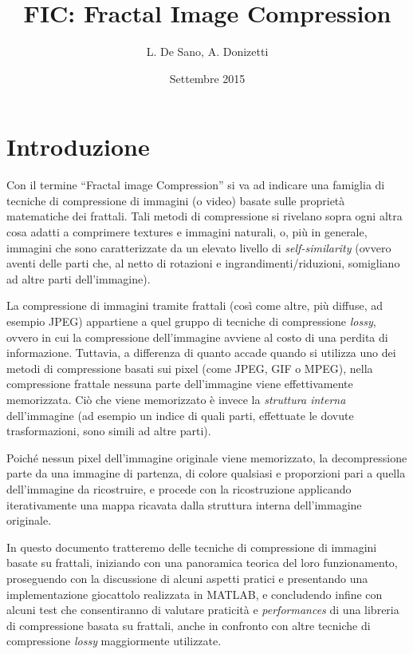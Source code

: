 \documentclass[11pt,a4paper,appendixprefix=true,numbers=noenddot]{scrreprt}
\author{L. De Sano, A. Donizetti}
\title{\textsc{FIC}: Fractal Image Compression}
\date{Settembre 2015}
\begin{document}
\maketitle

\tableofcontents

\chapter{Introduzione}

Con il termine ``Fractal image Compression'' si va ad indicare una famiglia di tecniche di compressione di immagini (o video) basate sulle proprietà matematiche dei frattali\cite{fisher}\cite{barnsley}. Tali metodi di compressione si rivelano sopra ogni altra cosa adatti a comprimere textures e immagini naturali, o, più in generale, immagini che sono caratterizzate da un elevato livello di \emph{self-similarity} (ovvero aventi delle parti che, al netto di rotazioni e ingrandimenti/riduzioni, somigliano ad altre parti dell'immagine).

La compressione di immagini tramite frattali (così come altre, più diffuse, ad esempio JPEG) appartiene a quel gruppo di tecniche di compressione \emph{lossy}, ovvero in cui la compressione dell'immagine avviene al costo di una perdita di informazione. Tuttavia, a differenza di quanto accade quando si utilizza uno dei metodi di compressione basati sui pixel (come JPEG, GIF o MPEG), nella compressione frattale nessuna parte dell'immagine viene effettivamente memorizzata. Ciò che viene memorizzato è invece la \emph{struttura interna} dell'immagine (ad esempio un indice di quali parti, effettuate le dovute trasformazioni, sono simili ad altre parti). 

Poiché nessun pixel dell'immagine originale viene memorizzato, la decompressione parte da una immagine di partenza, di colore qualsiasi e proporzioni pari a quella dell'immagine da ricostruire, e procede con la ricostruzione applicando iterativamente una mappa ricavata dalla struttura interna dell'immagine originale.

In questo documento tratteremo delle tecniche di compressione di immagini basate su frattali, iniziando con una panoramica teorica del loro funzionamento, proseguendo con la discussione di alcuni aspetti pratici e presentando una implementazione giocattolo realizzata in MATLAB, e concludendo infine con alcuni test che consentiranno di valutare praticità e \emph{performances} di una libreria di compressione basata su frattali, anche in confronto con altre tecniche di compressione \emph{lossy} maggiormente utilizzate.
\end{document}
